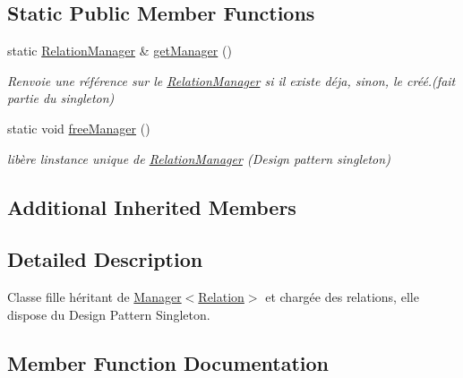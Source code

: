 \subsection*{Static Public Member Functions}
\begin{DoxyCompactItemize}
\item 
\mbox{\label{class_relation_manager_a525665dcd2599872667dd32f36506f41}} 
static \hyperlink{class_relation_manager}{Relation\+Manager} \& \hyperlink{class_relation_manager_a525665dcd2599872667dd32f36506f41}{get\+Manager} ()
\begin{DoxyCompactList}\small\item\em Renvoie une référence sur le \hyperlink{class_relation_manager}{Relation\+Manager} si il existe déja, sinon, le créé.(fait partie du singleton) \end{DoxyCompactList}\item 
\mbox{\label{class_relation_manager_a4c967c4473a2bd29ab558ebf74aed149}} 
static void \hyperlink{class_relation_manager_a4c967c4473a2bd29ab558ebf74aed149}{free\+Manager} ()
\begin{DoxyCompactList}\small\item\em libère l\textquotesingle{}instance unique de \hyperlink{class_relation_manager}{Relation\+Manager} (Design pattern singleton) \end{DoxyCompactList}\end{DoxyCompactItemize}
\subsection*{Additional Inherited Members}


\subsection{Detailed Description}
Classe fille héritant de \hyperlink{class_manager}{Manager$<$\+Relation$>$} et chargée des relations, elle dispose du Design Pattern Singleton. 

\subsection{Member Function Documentation}
\mbox{\label{class_relation_manager_a2933861a9b973a35031e799ef9d369b5}} 
